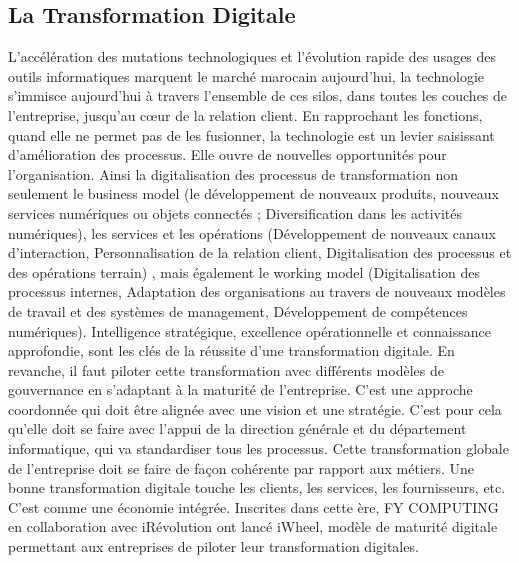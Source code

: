 \documentclass[a4paper,11pt,oneside]{report}
\begin{document}
\subsection{La Transformation Digitale}
L’accélération des mutations technologiques et l’évolution rapide des usages des outils informatiques marquent le marché marocain aujourd'hui, la technologie s’immisce aujourd’hui à travers l’ensemble de ces silos, dans toutes les couches de l’entreprise, jusqu’au cœur de la relation client. En rapprochant les fonctions, quand elle ne permet pas de les fusionner, la technologie est un levier saisissant d’amélioration des processus. Elle ouvre de nouvelles opportunités pour l’organisation. Ainsi la digitalisation des processus de transformation non seulement le business model (le développement de nouveaux produits, nouveaux services numériques ou objets connectés ; Diversification dans les activités numériques), les services et les opérations (Développement de nouveaux canaux d’interaction, Personnalisation de la relation client, Digitalisation des processus et des opérations terrain) , mais également le working model (Digitalisation des processus internes, Adaptation des organisations au travers de nouveaux modèles de travail et des systèmes de management, Développement de compétences numériques).
\newline
\newline
Intelligence stratégique, excellence opérationnelle et connaissance approfondie, sont les clés de la réussite d’une transformation digitale. En revanche, il faut piloter cette transformation avec différents modèles de gouvernance en s’adaptant à la maturité de l’entreprise. C’est une approche coordonnée qui doit être alignée avec une vision et une stratégie. C’est pour cela qu’elle doit se faire avec l’appui de la direction générale et du département informatique, qui va standardiser tous les processus. Cette transformation globale de l’entreprise doit se faire de façon cohérente par rapport aux métiers. Une bonne transformation digitale touche les clients, les services, les fournisseurs, etc. C’est comme une économie intégrée.
\newline
\newline
Inscrites dans cette ère, FY COMPUTING en collaboration avec iRévolution ont lancé iWheel, modèle de maturité digitale permettant aux entreprises de piloter leur transformation digitales.
\end{document}
